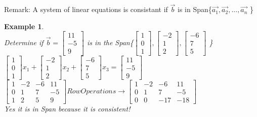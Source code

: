 \documentclass[a4paper,12pt]{book}
\theoremstyle{defn}
\theoremstyle{expl}
\newtheorem{expl}{Example}[section]
\begin{document}
Remark: A system of linear equations is consistant if $\vec{b}$ is in Span\{$\vec{a_1},\vec{a_2},...,\vec{a_n}$ \}\\
\begin{expl}\-\\
\textup{
Determine if $\vec{b} = \left[\begin{array}{c}11\\-5\\9\end{array}\right]$ is in the Span\{$\left[\begin{array}{c}1\\0\\1\end{array}\right],
\left[\begin{array}{c}-2\\1\\2\end{array}\right],
\left[\begin{array}{c}-6\\7\\5\end{array}\right]$ \}\\
$\left[\begin{array}{c}1\\0\\1\end{array}\right]x_1+
\left[\begin{array}{c}-2\\1\\2\end{array}\right]x_2+
\left[\begin{array}{c}-6\\7\\5\end{array}\right]x_3=
\left[\begin{array}{c}11\\-5\\9\end{array}\right]$\\
$\left[\begin{array}{ccc|c}1&-2&-6&11\\0&1&7&-5\\1&2&5&9\end{array}\right]RowOperations\rightarrow\left[\begin{array}{ccc|c}1&-2&-6&11\\0&1&7&-5\\0&0&-17&-18\end{array}\right]$\\
Yes it is in Span because it is consistent!
}\end{expl}
\end{document}
